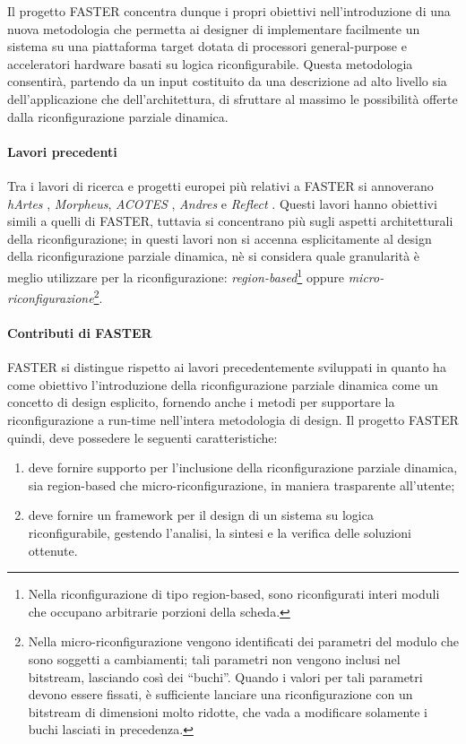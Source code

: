 Il progetto \ac{FASTER} concentra dunque i propri obiettivi nell'introduzione 
di una nuova metodologia che permetta ai designer di implementare facilmente un 
sistema su una piattaforma target dotata di processori general-purpose e 
acceleratori hardware basati su logica riconfigurabile. Questa metodologia 
consentirà, partendo da un input costituito da una descrizione ad alto livello 
sia dell'applicazione che dell'architettura, di sfruttare al massimo le 
possibilità offerte dalla riconfigurazione parziale dinamica.

\paragraph{Lavori precedenti}
Tra i lavori di ricerca e progetti europei più relativi a \ac{FASTER} si 
annoverano \emph{hArtes} \cite{HArtes}, \emph{Morpheus}, \emph{ACOTES} 
\cite{AcotesUrl, ACOTES}, \emph{Andres} e \emph{Reflect} \cite{Reflect}. %
Questi lavori hanno obiettivi simili a quelli di \ac{FASTER}, tuttavia si 
concentrano più sugli aspetti architetturali della riconfigurazione; in questi 
lavori non si accenna esplicitamente al design della riconfigurazione parziale 
dinamica, nè si considera quale granularità è meglio utilizzare per la 
riconfigurazione: \emph{region-based}\footnote{Nella riconfigurazione di tipo 
region-based, sono riconfigurati interi moduli che occupano arbitrarie porzioni 
della scheda.} oppure \emph{micro-riconfigurazione}\footnote{Nella 
micro-riconfigurazione vengono identificati dei parametri del modulo che 
sono soggetti a cambiamenti; tali parametri non vengono inclusi nel bitstream, 
lasciando così dei ``buchi''. Quando i valori per tali parametri devono essere 
fissati, è sufficiente lanciare una riconfigurazione con un bitstream di 
dimensioni molto ridotte, che vada a modificare solamente i buchi lasciati in 
precedenza.}.

\paragraph{Contributi di \ac{FASTER}}
\ac{FASTER} si distingue rispetto ai lavori precedentemente sviluppati in 
quanto ha come obiettivo l'introduzione della riconfigurazione parziale 
dinamica come un concetto di design esplicito, fornendo anche i metodi per 
supportare la riconfigurazione a run-time nell'intera metodologia di design.
Il progetto \ac{FASTER} quindi, deve possedere le seguenti caratteristiche:
\begin{enumerate}
 \item deve fornire supporto per l'inclusione della riconfigurazione parziale 
dinamica, sia region-based che micro-riconfigurazione, in maniera trasparente 
all'utente;
 \item deve fornire un framework per il design di un sistema su logica 
riconfigurabile, gestendo l'analisi, la sintesi e la verifica delle soluzioni 
ottenute.
\end{enumerate}

